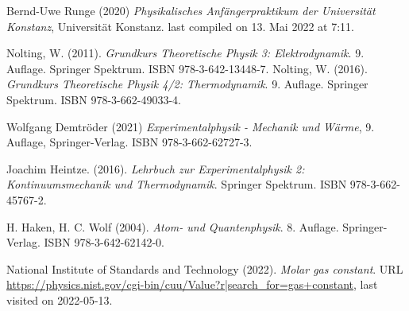 \documentclass[../main.tex]{subfiles}
\begin{document}
	\begin{thebibliography}{99}
		 Bernd-Uwe Runge (2020) \emph{Physikalisches Anfängerpraktikum der Universität Konstanz}, Universität Konstanz. last compiled on 13. Mai 2022 at 7:11. 

		 Nolting, W. (2011). \emph{Grundkurs Theoretische Physik 3: Elektrodynamik}. 9. Auflage. Springer Spektrum. ISBN 978-3-642-13448-7.
		 Nolting, W. (2016). \emph{Grundkurs Theoretische Physik 4/2: Thermodynamik}. 9. Auflage. Springer Spektrum. ISBN 978-3-662-49033-4.

		 Wolfgang Demtröder (2021) \emph{Experimentalphysik - Mechanik und Wärme}, 9. Auflage, Springer-Verlag. ISBN 978-3-662-62727-3.
		
		 Joachim Heintze. (2016). \emph{Lehrbuch zur Experimentalphysik 2: Kontinuumsmechanik und Thermodynamik}. Springer Spektrum. ISBN 978-3-662-45767-2.


		 H. Haken, H. C. Wolf (2004). \emph{Atom- und Quantenphysik}. 8. Auflage. Springer-Verlag. ISBN 978-3-642-62142-0.

		 National Institute of Standards and Technology (2022). \emph{Molar gas constant}. URL \url{https://physics.nist.gov/cgi-bin/cuu/Value?r|search_for=gas+constant}, last visited on 2022-05-13.


\end{thebibliography}
\end{document}
